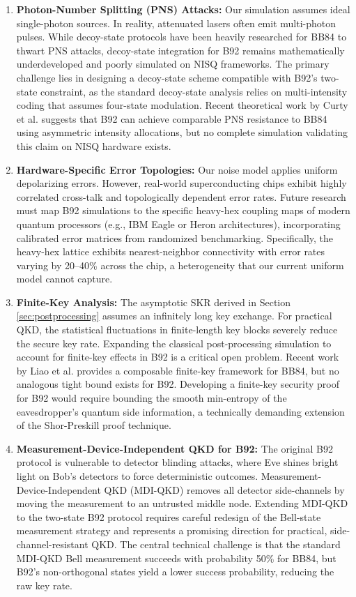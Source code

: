 \documentclass[conference]{IEEEtran}
\begin{document}
\begin{enumerate}
    \item \textbf{Photon-Number Splitting (PNS) Attacks:} Our simulation assumes ideal single-photon sources. In reality, attenuated lasers often emit multi-photon pulses. While decoy-state protocols have been heavily researched for BB84 to thwart PNS attacks, decoy-state integration for B92 remains mathematically underdeveloped and poorly simulated on NISQ frameworks. The primary challenge lies in designing a decoy-state scheme compatible with B92's two-state constraint, as the standard decoy-state analysis relies on multi-intensity coding that assumes four-state modulation. Recent theoretical work by Curty et al. \cite{curty2014measurement} suggests that B92 can achieve comparable PNS resistance to BB84 using asymmetric intensity allocations, but no complete simulation validating this claim on NISQ hardware exists.

    \item \textbf{Hardware-Specific Error Topologies:} Our noise model applies uniform depolarizing errors. However, real-world superconducting chips exhibit highly correlated cross-talk and topologically dependent error rates. Future research must map B92 simulations to the specific heavy-hex coupling maps of modern quantum processors (e.g., IBM Eagle or Heron architectures), incorporating calibrated error matrices from randomized benchmarking. Specifically, the heavy-hex lattice exhibits nearest-neighbor connectivity with error rates varying by 20--40\% across the chip, a heterogeneity that our current uniform model cannot capture.

    \item \textbf{Finite-Key Analysis:} The asymptotic SKR derived in Section \ref{sec:postprocessing} assumes an infinitely long key exchange. For practical QKD, the statistical fluctuations in finite-length key blocks severely reduce the secure key rate. Expanding the classical post-processing simulation to account for finite-key effects in B92 is a critical open problem. Recent work by Liao et al. \cite{liao2020finite} provides a composable finite-key framework for BB84, but no analogous tight bound exists for B92. Developing a finite-key security proof for B92 would require bounding the smooth min-entropy of the eavesdropper's quantum side information, a technically demanding extension of the Shor-Preskill proof technique.

    \item \textbf{Measurement-Device-Independent QKD for B92:} The original B92 protocol is vulnerable to detector blinding attacks, where Eve shines bright light on Bob's detectors to force deterministic outcomes. Measurement-Device-Independent QKD (MDI-QKD) \cite{lo2012measurement} removes all detector side-channels by moving the measurement to an untrusted middle node. Extending MDI-QKD to the two-state B92 protocol requires careful redesign of the Bell-state measurement strategy and represents a promising direction for practical, side-channel-resistant QKD. The central technical challenge is that the standard MDI-QKD Bell measurement succeeds with probability 50\% for BB84, but B92's non-orthogonal states yield a lower success probability, reducing the raw key rate.


\end{enumerate}
\end{document}
